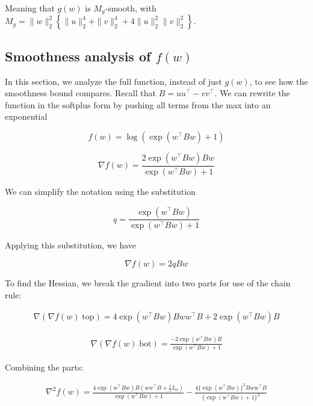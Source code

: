 \documentclass[11pt]{article}
\begin{document}
Meaning that $g(w)$ is $M_g$-smooth, with $M_g = \|w\|_2^2 \left\{ \|u\|_2^4 + \|v\|_2^4 + 4 \|u\|_2^2 \|v\|_2^2 \right\}$.

\subsection{Smoothness analysis of $f(w)$}

In this section, we analyze the full function, instead of just $g(w)$, to see how the smoothness bound compares. Recall that $B = uu^\top - vv^\top$. We can rewrite the function in the softplus form by pushing all terms from the max into an exponential

\begin{equation}
\label{eq:f}
    f(w) = \log(\exp(w^{\top}Bw) + 1)
\end{equation}

\begin{equation}
    \nabla f(w) = \frac{2 \exp(w^{\top}Bw)Bw}{\exp(w^{\top}Bw) + 1}
\end{equation}

We can simplify the notation using the substitution

\begin{equation}
q = \frac{\exp(w^{\top}Bw)}{\exp(w^{\top}Bw) + 1}
\end{equation}

Applying this substitution, we have

\begin{equation}
\label{eq:grad_f}
    \nabla f(w) = 2qBw
\end{equation}

To find the Hessian, we break the gradient into two parts for use of the chain rule:

\begin{align*}
    \nabla (\nabla f(w) \; \textrm{top}) = 4 \exp(w^{\top}Bw)Bww^{\top}B  + 2 \exp(w^{\top}Bw)B
\end{align*}

\begin{align*}
    \nabla (\nabla f(w) \; \textrm{bot}) = \frac{-2 \exp(w^{\top}Bw)B}{\exp(w^{\top}Bw) + 1}
\end{align*}

Combining the parts:

\begin{align*}
    \nabla^2 f(w) = \frac{4 \exp(w^{\top}Bw)B(ww^{\top}B + \frac{1}{2}I_m)}{\exp(w^{\top}Bw) + 1} - \frac{4 \{\exp(w^{\top}Bw)\}^2 Bww^{\top}B }{\{\exp(w^{\top}Bw) + 1\}^2}
\end{align*}
\end{document}
